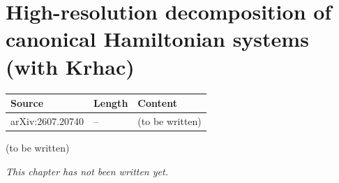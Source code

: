 \chapter{High-resolution decomposition of canonical Hamiltonian systems (with Krhac)}\label{ch:c28}
\begin{paracol}{2}

\begin{sources}
\begin{tabularx}{\linewidth}{@{}l l L@{}}
\toprule
\textbf{Source} & \textbf{Length} & \textbf{Content}\\
\midrule
arXiv:2607.20740 & -- & (to be written)\\
\bottomrule
\end{tabularx}

\end{sources}

\begin{reading}
(to be written)
\end{reading}

\emph{This chapter has not been written yet.}

\flushside
\end{paracol}
